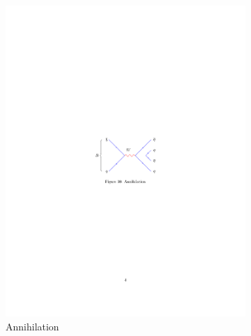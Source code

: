 \begin{figure}[!h]
\begin{subfigure}[b]{0.32\textwidth}
        \includegraphics[width=1.0\textwidth]{figs/Theory/An.pdf}
        \caption{Annihilation}
        \label{fig:theory_ann}
    \end{subfigure}
    \begin{subfigure}[b]{0.32\textwidth}
        \centering

\end{subfigure}
\end{figure}

